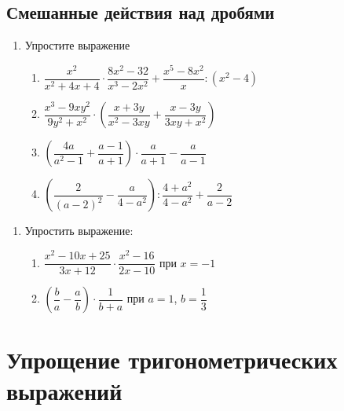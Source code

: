 \documentclass[10pt, a4paper]{article}
\begin{document}
\subsection{Смешанные действия над дробями}
\begin{enumerate}
	\item Упростите выражение
		\begin{enumerate}[label=\asbuk*)]
			\item $\dfrac{x^2}{x^2+4x+4}\cdot\dfrac{8x^2-32}{x^3-2x^2}+\dfrac{x^5-8x^2}{x}:(x^2-4)$
			\item $\dfrac{x^3-9xy^2}{9y^2+x^2}\cdot\left( \dfrac{x+3y}{x^2-3xy}+\dfrac{x-3y}{3xy+x^2}\right) $
			\item $\left(\dfrac{4a}{a^2-1}+\dfrac{a-1}{a+1} \right) \cdot \dfrac{a}{a+1}-\dfrac{a}{a-1}$
			\item $\left( \dfrac{2}{(a-2)^2}-\dfrac{a}{4-a^2}\right):\dfrac{4+a^2}{4-a^2}+\dfrac{2}{a-2}$
		\end{enumerate}
\end{enumerate}
\begin{enumerate}
	\item Упростить выражение:
	\begin{multicols}{2}
		\begin{enumerate}
			\item $\dfrac{x^2-10x+25}{3x+12}\cdot\dfrac{x^2-16}{2x-10}$ при $x=-1$
			\item $\left(\dfrac{b}{a}-\dfrac{a}{b}\right)\cdot\dfrac{1}{b+a}$ при $a=1$, $b=\dfrac{1}{3}$
		\end{enumerate}
	\end{multicols}
\end{enumerate}
\section{Упрощение тригонометрических выражений}
\end{document}
